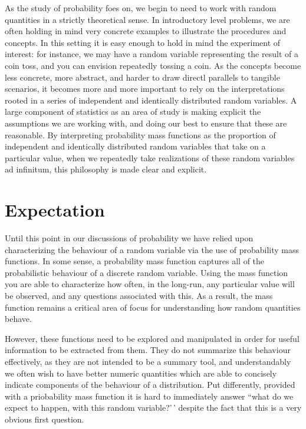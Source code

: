 \documentclass[
  letterpaper,
  DIV=11,
  numbers=noendperiod]{scrreprt}
\begin{document}
As the study of probability foes on, we begin to need to work with
random quantities in a strictly theoretical sense. In introductory level
problems, we are often holding in mind very concrete examples to
illustrate the procedures and concepts. In this setting it is easy
enough to hold in mind the experiment of interest: for instance, we may
have a random variable representing the result of a coin toss, and you
can envision repeatedly tossing a coin. As the concepts become less
concrete, more abstract, and harder to draw directl parallels to
tangible scenarios, it becomes more and more important to rely on the
interpretations rooted in a series of independent and identically
distributed random variables. A large component of statistics as an area
of study is making explicit the assumptions we are working with, and
doing our best to ensure that these are reasonable. By interpreting
probability mass functions as the proportion of independent and
identically distributed random variables that take on a particular
value, when we repeatedly take realizations of these random variables ad
infinitum, this philosophy is made clear and explicit.

\section{Expectation}\label{expectation}

Until this point in our discussions of probability we have relied upon
characterizing the behaviour of a random variable via the use of
probability mass functions. In some sense, a probability mass function
captures all of the probabilistic behaviour of a discrete random
variable. Using the mass function you are able to characterize how
often, in the long-run, any particular value will be observed, and any
questions associated with this. As a result, the mass function remains a
critical area of focus for understanding how random quantities behave.

However, these functions need to be explored and manipulated in order
for useful information to be extracted from them. They do not summarize
this behaviour effectively, as they are not intended to be a summary
tool, and understandably we often wish to have better numeric quantities
which are able to concisely indicate components of the behaviour of a
distribution. Put differently, provided with a priobability mass
function it is hard to immediately answer ``what do we expect to happen,
with this random variable?'\,' despite the fact that this is a very
obvious first question.
\end{document}
